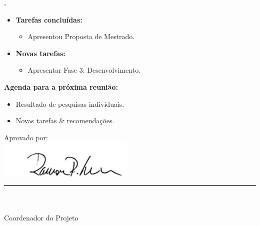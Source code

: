 		
			
   \textbf{\julia.} 
	\begin{itemize}
		\item \textbf{Tarefas concluídas:}
			\begin{itemize}    
				\item Apresentou Proposta de Mestrado.
			\end{itemize}
		
		\item \textbf{Novas tarefas:}
			\begin{itemize} 
			    \item Apresentar Fase 3: Desenvolvimento. 
			\end{itemize}
	\end{itemize}		



\textbf{Agenda para a próxima reunião:}
  \begin{itemize}
    \item Resultado de pesquisas individuais.
    \item Novas tarefas \& recomendações.
  \end{itemize}


\vspace{5mm}%
\parbox[t]{70mm}{
  Aprovado por: \\[5mm]
  \centering
  \includegraphics[width=65mm]{figs/logo/assinatura-ramon.png} \\[-4mm]
  \rule[2mm]{70mm}{0.1mm} \\
  \ramon \\[1mm]
  Coordenador do Projeto \\
}

\fim